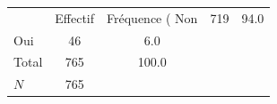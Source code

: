 {
\def\sym#1{\ifmmode^{#1}\else\(^{#1}\)\fi}
\begin{tabular}{l*{1}{cc}}
\toprule
            &    Effectif&Fréquence (%
\midrule
Non         &         719&        94.0\\
Oui         &          46&         6.0\\
Total       &         765&       100.0\\
\midrule
\(N\)       &         765&            \\
\bottomrule
\end{tabular}
}
